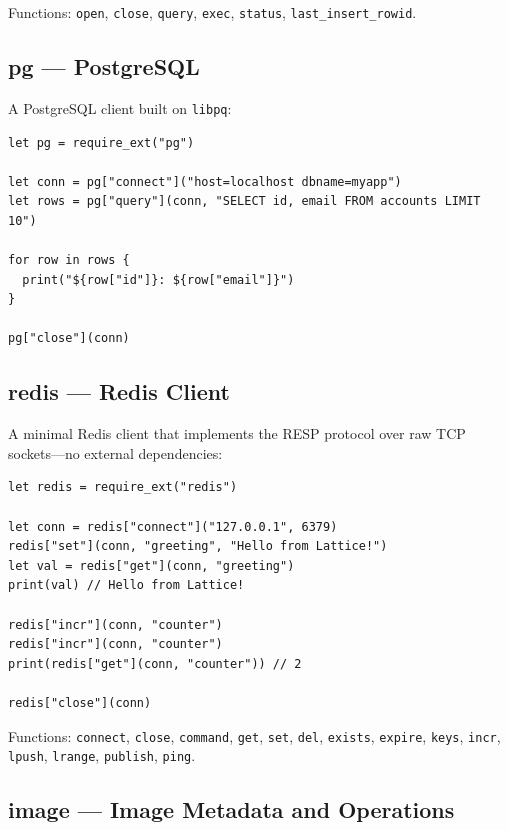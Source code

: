 Functions: \lstinline|open|, \lstinline|close|, \lstinline|query|, \lstinline|exec|, \lstinline|status|, \lstinline|last_insert_rowid|.

\subsection{pg --- PostgreSQL}

A PostgreSQL client built on \lstinline|libpq|:

\begin{lstlisting}[language=Lattice, caption={Using the PostgreSQL extension}]
let pg = require_ext("pg")

let conn = pg["connect"]("host=localhost dbname=myapp")
let rows = pg["query"](conn, "SELECT id, email FROM accounts LIMIT 10")

for row in rows {
  print("${row["id"]}: ${row["email"]}")
}

pg["close"](conn)
\end{lstlisting}

\subsection{redis --- Redis Client}

A minimal Redis client that implements the RESP protocol over raw TCP sockets---no external dependencies:

\begin{lstlisting}[language=Lattice, caption={Using the Redis extension}]
let redis = require_ext("redis")

let conn = redis["connect"]("127.0.0.1", 6379)
redis["set"](conn, "greeting", "Hello from Lattice!")
let val = redis["get"](conn, "greeting")
print(val) // Hello from Lattice!

redis["incr"](conn, "counter")
redis["incr"](conn, "counter")
print(redis["get"](conn, "counter")) // 2

redis["close"](conn)
\end{lstlisting}

Functions: \lstinline|connect|, \lstinline|close|, \lstinline|command|, \lstinline|get|, \lstinline|set|, \lstinline|del|, \lstinline|exists|, \lstinline|expire|, \lstinline|keys|, \lstinline|incr|, \lstinline|lpush|, \lstinline|lrange|, \lstinline|publish|, \lstinline|ping|.

\subsection{image --- Image Metadata and Operations}

